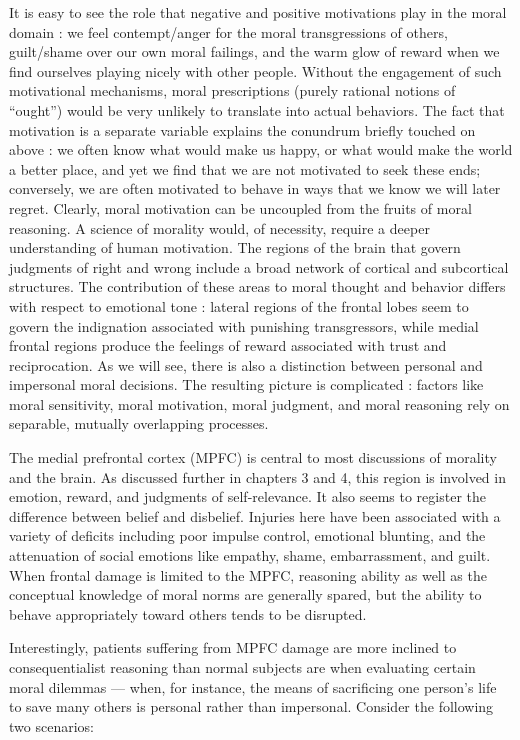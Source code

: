 \documentclass[a4paper,14pt]{extbook}
\begin{document}
It is easy to see the role that negative and positive motivations play in the moral domain :
we feel contempt/anger for the moral transgressions of others, guilt/shame over our own moral failings, and the warm glow of reward when we find ourselves playing nicely with other people.
Without the engagement of such motivational mechanisms, moral prescriptions (purely rational notions of ``ought'') would be very unlikely to translate into actual behaviors.
The fact that motivation is a separate variable explains the conundrum briefly touched on above :
we often know what would make us happy, or what would make the world a better place, and yet we find that we are not motivated to seek these ends;
conversely, we are often motivated to behave in ways that we know we will later regret.
Clearly, moral motivation can be uncoupled from the fruits of moral reasoning.
A science of morality would, of necessity, require a deeper understanding of human motivation.
The regions of the brain that govern judgments of right and wrong include a broad network of cortical and subcortical structures.
The contribution of these areas to moral thought and behavior differs with respect to emotional tone :
lateral regions of the frontal lobes seem to govern the indignation associated with punishing transgressors, while medial frontal regions produce the feelings of reward associated with trust and reciprocation.
As we will see, there is also a distinction between personal and impersonal moral decisions.
The resulting picture is complicated :
factors like moral sensitivity, moral motivation, moral judgment, and moral reasoning rely on separable, mutually overlapping processes.

The medial prefrontal cortex (MPFC) is central to most discussions of morality and the brain.
As discussed further in chapters 3 and 4, this region is involved in emotion, reward, and judgments of self-relevance.
It also seems to register the difference between belief and disbelief.
Injuries here have been associated with a variety of deficits including poor impulse control, emotional blunting, and the attenuation of social emotions like empathy, shame, embarrassment, and guilt.
When frontal damage is limited to the MPFC, reasoning ability as well as the conceptual knowledge of moral norms are generally spared, but the ability to behave appropriately toward others tends to be disrupted.

Interestingly, patients suffering from MPFC damage are more inclined to consequentialist reasoning than normal subjects are when evaluating certain moral dilemmas --- when, for instance, the means of sacrificing one person's life to save many others is personal rather than impersonal.
Consider the following two scenarios:
\end{document}
